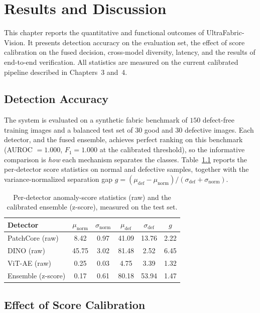 \chapter{Results and Discussion}

This chapter reports the quantitative and functional outcomes of UltraFabric-Vision. It presents detection accuracy on the evaluation set, the effect of score calibration on the fused decision, cross-model diversity, latency, and the results of end-to-end verification. All statistics are measured on the current calibrated pipeline described in Chapters~3 and~4.

\section{Detection Accuracy}

The system is evaluated on a synthetic fabric benchmark of $150$ defect-free training images and a balanced test set of $30$ good and $30$ defective images. Each detector, and the fused ensemble, achieves perfect ranking on this benchmark (AUROC $=1.000$, $F_1 = 1.000$ at the calibrated threshold), so the informative comparison is \emph{how} each mechanism separates the classes. Table~\ref{tab:res} reports the per-detector score statistics on normal and defective samples, together with the variance-normalized separation gap $g = (\mu_{\text{def}} - \mu_{\text{norm}})/(\sigma_{\text{def}} + \sigma_{\text{norm}})$.

\begin{table}[htb]
\centering
\caption{Per-detector anomaly-score statistics (raw) and the calibrated ensemble (z-score), measured on the test set.}
\label{tab:res}
\begin{tabular}{lccccc}
\hline
\textbf{Detector} & $\mu_{\text{norm}}$ & $\sigma_{\text{norm}}$ & $\mu_{\text{def}}$ & $\sigma_{\text{def}}$ & $g$ \\
\hline
PatchCore (raw)     & 8.42  & 0.97 & 41.09 & 13.76 & 2.22 \\
DINO (raw)          & 45.75 & 3.02 & 81.48 & 2.52  & 6.45 \\
ViT-AE (raw)        & 0.25  & 0.03 & 4.75  & 3.39  & 1.32 \\
Ensemble (z-score)  & 0.17  & 0.61 & 80.18 & 53.94 & 1.47 \\
\hline
\end{tabular}
\end{table}

\section{Effect of Score Calibration}

